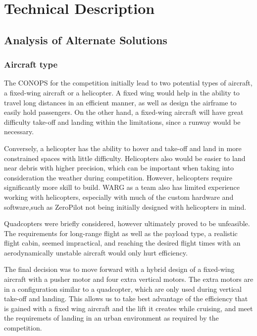 \section{Technical Description}
\label{sec:technical}

%
%

\subsection{Analysis of Alternate Solutions}

\subsubsection{Aircraft type}

The CONOPS for the competition initially lead to two potential types of aircraft,
a fixed-wing aircraft or a helicopter. A fixed wing would help in the ability
to travel long distances in an efficient manner, as well as design the airframe
to easily hold passengers. On the other hand, a fixed-wing aircraft will have
great difficulty take-off and landing within the limitations, since a runway
would be necessary.

Conversely, a helicopter has the ability to hover and take-off and land in more
constrained spaces with little difficulty. Helicopters also would be easier to
land near debris with higher precision, which can be important when taking into
consideration the weather during competition. However, helicopters require
significantly more skill to build. WARG as a team also has limited experience
working with helicopters, especially with much of the custom hardware and
software,such as ZeroPilot not being initially designed with helicopters in
mind.

Quadcopters were briefly considered, however ultimately proved to be
unfeasible. The requirements for long-range flight as well as the payload type,
a realistic flight cabin, seemed impractical, and reaching the desired flight
times with an aerodynamically unstable aircraft would only hurt efficiency.

The final decision was to move forward with a hybrid design of a fixed-wing
aircraft with a pusher motor and four extra vertical motors. The extra motors
are in a configuration similar to a quadcopter, which are only used during
vertical take-off and landing. This allows us to take best advantage of the
efficiency that is gained with a fixed wing aircraft and the lift it creates
while cruising, and meet the requiremets of landing in an urban environment as
required by the competition.

